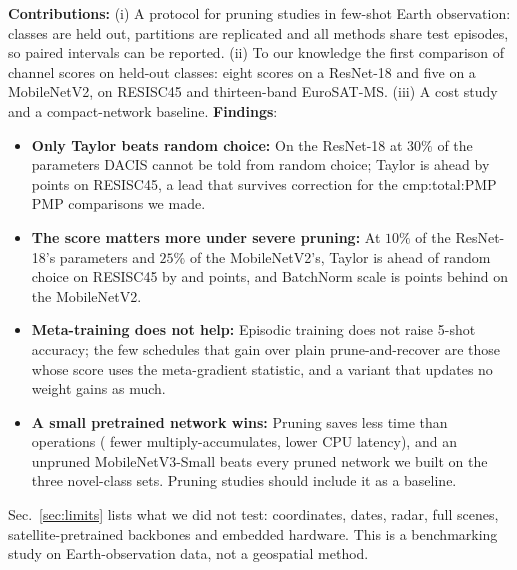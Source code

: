 \textbf{Contributions:} (i) A protocol for pruning studies in few-shot Earth observation: classes are held out, partitions are replicated and all methods share test episodes, so paired intervals can be reported. (ii) To our knowledge the first comparison of channel scores on held-out classes: eight scores on a ResNet-18 and five on a MobileNetV2, on RESISC45 and thirteen-band EuroSAT-MS. (iii) A cost study and a compact-network baseline. \textbf{Findings}:
\begin{itemize}[leftmargin=*,itemsep=0pt,topsep=2pt]
  \item \textbf{Only Taylor beats random choice:} On the ResNet-18 at $30\%$ of the parameters DACIS cannot be told from random choice; Taylor is ahead by  points on RESISC45, a lead that survives correction for the \num{cmp:total:PMP} PMP comparisons we made.
  \item \textbf{The score matters more under severe pruning:} At $10\%$ of the ResNet-18's parameters and $25\%$ of the MobileNetV2's, Taylor is ahead of random choice on RESISC45 by  and  points, and BatchNorm scale is  points behind on the MobileNetV2.
  \item \textbf{Meta-training does not help:} Episodic training does not raise 5-shot accuracy; the few schedules that gain over plain prune-and-recover are those whose score uses the meta-gradient statistic, and a variant that updates no weight gains as much.
  \item \textbf{A small pretrained network wins:} Pruning saves less time than operations ( fewer multiply-accumulates,  lower CPU latency), and an unpruned MobileNetV3-Small beats every pruned network we built on the three novel-class sets. Pruning studies should include it as a baseline.
\end{itemize}
Sec.~\ref{sec:limits} lists what we did not test: coordinates, dates, radar, full scenes, satellite-pretrained backbones and embedded hardware. This is a benchmarking study on Earth-observation data, not a geospatial method.
